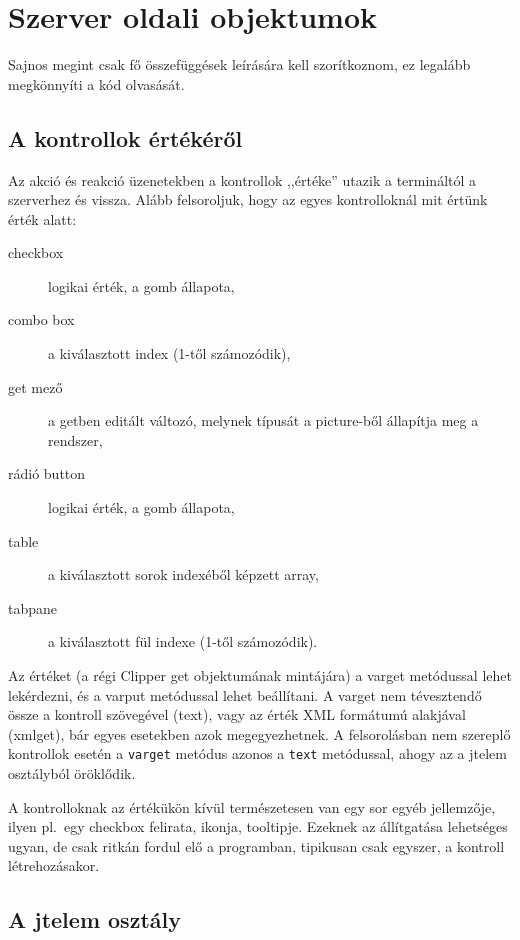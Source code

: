
\section{Szerver oldali objektumok} 

Sajnos megint csak fő összefüggések leírására kell szorítkoznom,
ez legalább megkönnyíti a kód olvasását.

\subsection{A kontrollok értékéről}

Az akció és reakció üzenetekben a kontrollok ,,értéke'' utazik
a termináltól a szerverhez és vissza. Alább felsoroljuk, hogy az egyes
kontrolloknál mit értünk érték alatt:

\begin{description}
\item[checkbox]      logikai érték, a gomb állapota, 
\item[combo box]     a kiválasztott index (1-től számozódik),
\item[get mező]      a getben editált változó, melynek típusát a picture-ből állapítja meg a rendszer,
\item[rádió button]  logikai érték, a gomb állapota,
\item[table]         a kiválasztott sorok indexéből képzett array,
\item[tabpane]       a kiválasztott fül indexe (1-től számozódik).
\end{description}

Az értéket (a régi Clipper get objektumának mintájára) a varget metódussal
lehet lekérdezni, és a varput metódussal lehet beállítani. 
A varget nem tévesztendő össze a kontroll szövegével (text),
vagy az érték XML formátumú alakjával (xmlget), bár egyes esetekben
azok megegyezhetnek.  A felsorolásban nem szereplő kontrollok esetén a
\verb!varget! metódus azonos a \verb!text! metódussal, ahogy az a jtelem 
osztályból öröklődik.


A kontrolloknak az értékükön kívül természetesen van egy sor
egyéb jellemzője, ilyen pl.\ egy checkbox felirata, ikonja, tooltipje.
Ezeknek az állítgatása lehetséges ugyan, de csak ritkán fordul elő
a programban, tipikusan csak egyszer, a kontroll létrehozásakor.


\subsection{A jtelem osztály}

